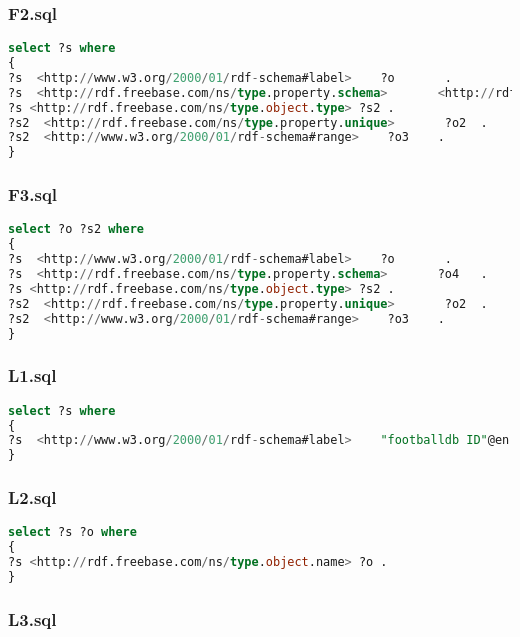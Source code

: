 \documentclass[titlepage, a4paper, 12pt] {article}
\begin{document}
\subsubsection{F2.sql}

\begin{lstlisting}[language=SQL] 
select ?s where
{
?s  <http://www.w3.org/2000/01/rdf-schema#label>    ?o       .
?s  <http://rdf.freebase.com/ns/type.property.schema>       <http://rdf.freebase.com/ns/american_football.football_player>   .
?s <http://rdf.freebase.com/ns/type.object.type> ?s2 .
?s2  <http://rdf.freebase.com/ns/type.property.unique>       ?o2  .
?s2  <http://www.w3.org/2000/01/rdf-schema#range>    ?o3    .
}
\end{lstlisting}

\subsubsection{F3.sql}

\begin{lstlisting}[language=SQL] 
select ?o ?s2 where
{
?s  <http://www.w3.org/2000/01/rdf-schema#label>    ?o       .
?s  <http://rdf.freebase.com/ns/type.property.schema>       ?o4   .
?s <http://rdf.freebase.com/ns/type.object.type> ?s2 .
?s2  <http://rdf.freebase.com/ns/type.property.unique>       ?o2  .
?s2  <http://www.w3.org/2000/01/rdf-schema#range>    ?o3    .
}
\end{lstlisting}

\subsubsection{L1.sql}

\begin{lstlisting}[language=SQL] 
select ?s where
{
?s  <http://www.w3.org/2000/01/rdf-schema#label>    "footballdb ID"@en       .
}
\end{lstlisting}

\subsubsection{L2.sql}

\begin{lstlisting}[language=SQL] 
select ?s ?o where
{
?s <http://rdf.freebase.com/ns/type.object.name> ?o .
}
\end{lstlisting}

\subsubsection{L3.sql}
\end{document}
